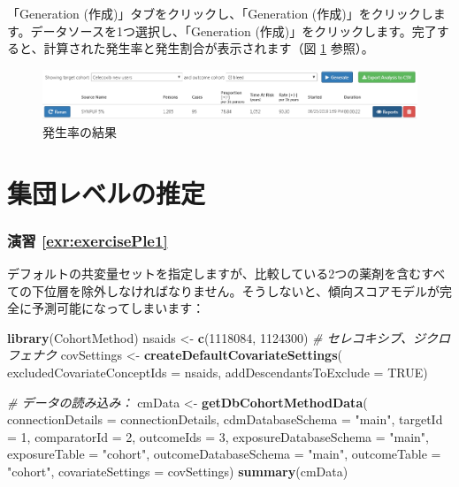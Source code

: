\documentclass[
  11pt]{book}
\newenvironment{Shaded}{\begin{snugshade}}{\end{snugshade}}
\newcommand{\AttributeTok}[1]{\textcolor[rgb]{0.13,0.29,0.53}{#1}}
\newcommand{\CommentTok}[1]{\textcolor[rgb]{0.56,0.35,0.01}{\textit{#1}}}
\newcommand{\ConstantTok}[1]{\textcolor[rgb]{0.56,0.35,0.01}{#1}}
\newcommand{\DecValTok}[1]{\textcolor[rgb]{0.00,0.00,0.81}{#1}}
\newcommand{\FunctionTok}[1]{\textcolor[rgb]{0.13,0.29,0.53}{\textbf{#1}}}
\newcommand{\NormalTok}[1]{#1}
\newcommand{\OtherTok}[1]{\textcolor[rgb]{0.56,0.35,0.01}{#1}}
\newcommand{\StringTok}[1]{\textcolor[rgb]{0.31,0.60,0.02}{#1}}
\theoremstyle{definition}
\theoremstyle{definition}
\theoremstyle{definition}
\theoremstyle{definition}
\theoremstyle{remark}
\begin{document}
「Generation (作成)」タブをクリックし、「Generation (作成)」をクリックします。データソースを1つ選択し、「Generation (作成)」をクリックします。完了すると、計算された発生率と発生割合が表示されます（図 \ref{fig:irResults} 参照）。

\begin{figure}

{\centering \includegraphics[width=1\linewidth]{images/SuggestedAnswers/irResults} 

}

\caption{発生率の結果}\label{fig:irResults}
\end{figure}

\section{集団レベルの推定}\label{Pleanswers}

\subsubsection*{演習 \ref{exr:exercisePle1}}\label{ux6f14ux7fd2-refexrexerciseple1}

デフォルトの共変量セットを指定しますが、比較している2つの薬剤を含むすべての下位層を除外しなければなりません。そうしないと、傾向スコアモデルが完全に予測可能になってしまいます：

\begin{Shaded}
\begin{Highlighting}[]
\FunctionTok{library}\NormalTok{(CohortMethod)}
\NormalTok{nsaids }\OtherTok{\textless{}{-}} \FunctionTok{c}\NormalTok{(}\DecValTok{1118084}\NormalTok{, }\DecValTok{1124300}\NormalTok{) }\CommentTok{\# セレコキシブ、ジクロフェナク}
\NormalTok{covSettings }\OtherTok{\textless{}{-}} \FunctionTok{createDefaultCovariateSettings}\NormalTok{(}
  \AttributeTok{excludedCovariateConceptIds =}\NormalTok{ nsaids,}
  \AttributeTok{addDescendantsToExclude =} \ConstantTok{TRUE}\NormalTok{)}

\CommentTok{\# データの読み込み：}
\NormalTok{cmData }\OtherTok{\textless{}{-}} \FunctionTok{getDbCohortMethodData}\NormalTok{(}
  \AttributeTok{connectionDetails =}\NormalTok{ connectionDetails,}
  \AttributeTok{cdmDatabaseSchema =} \StringTok{"main"}\NormalTok{,}
  \AttributeTok{targetId =} \DecValTok{1}\NormalTok{,}
  \AttributeTok{comparatorId =} \DecValTok{2}\NormalTok{,}
  \AttributeTok{outcomeIds =} \DecValTok{3}\NormalTok{,}
  \AttributeTok{exposureDatabaseSchema =} \StringTok{"main"}\NormalTok{,}
  \AttributeTok{exposureTable =} \StringTok{"cohort"}\NormalTok{,}
  \AttributeTok{outcomeDatabaseSchema =} \StringTok{"main"}\NormalTok{,}
  \AttributeTok{outcomeTable =} \StringTok{"cohort"}\NormalTok{,}
  \AttributeTok{covariateSettings =}\NormalTok{ covSettings)}
\FunctionTok{summary}\NormalTok{(cmData)}
\end{Highlighting}
\end{Shaded}
\end{document}
